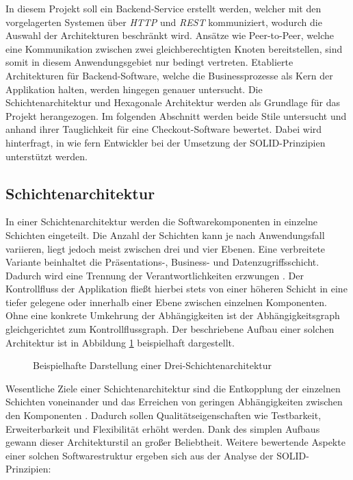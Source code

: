 In diesem Projekt soll ein Backend-Service erstellt werden, welcher mit den vorgelagerten Systemen über \emph{\acrshort{HTTP}} und \emph{\acrshort{REST}} kommuniziert, wodurch die Auswahl der Architekturen beschränkt wird. Ansätze wie Peer-to-Peer, welche eine Kommunikation zwischen zwei gleichberechtigten Knoten bereitstellen, sind somit in diesem Anwendungsgebiet nur bedingt vertreten. Etablierte Architekturen für Backend-Software, welche die Businessprozesse als Kern der Applikation halten, werden hingegen genauer untersucht. Die Schichtenarchitektur und Hexagonale Architektur werden als Grundlage für das Projekt herangezogen. Im folgenden Abschnitt werden beide Stile untersucht und anhand ihrer Tauglichkeit für eine Checkout-Software bewertet. Dabei wird hinterfragt, in wie fern Entwickler bei der Umsetzung der SOLID-Prinzipien unterstützt werden.

\subsection{Schichtenarchitektur}

In einer Schichtenarchitektur werden die Softwarekomponenten in einzelne Schichten eingeteilt. Die Anzahl der Schichten kann je nach Anwendungsfall variieren, liegt jedoch meist zwischen drei und vier Ebenen. Eine verbreitete Variante beinhaltet die Präsentations-, Business- und Datenzugriffsschicht. Dadurch wird eine Trennung der Verantwortlichkeiten erzwungen \cite[S. 185]{Buschmann.2011}. Der Kontrollfluss der Applikation fließt hierbei stets von einer höheren Schicht in eine tiefer gelegene oder innerhalb einer Ebene zwischen einzelnen Komponenten. Ohne eine konkrete Umkehrung der Abhängigkeiten ist der Abhängigkeitsgraph gleichgerichtet zum Kontrollflussgraph. \cite[S. 17ff.]{Fowler.2011} Der beschriebene Aufbau einer solchen Architektur ist in Abbildung \ref{fig:Schichtenarchitektur} beispielhaft dargestellt. 

\begin{figure}[H]
	\centering
	\large
	
	\caption{Beispielhafte Darstellung einer Drei-Schichtenarchitektur}
	\label{fig:Schichtenarchitektur}
\end{figure}

\pagebreak

Wesentliche Ziele einer Schichtenarchitektur sind die Entkopplung der einzelnen Schichten voneinander und das Erreichen von geringen Abhängigkeiten zwischen den Komponenten \cite[S. 17]{Fowler.2011}. Dadurch sollen Qualitätseigenschaften wie Testbarkeit, Erweiterbarkeit und Flexibilität erhöht werden. Dank des simplen Aufbaus gewann dieser Architekturstil an großer Beliebtheit. Weitere bewertende Aspekte einer solchen Softwarestruktur ergeben sich aus der Analyse der SOLID-Prinzipien:

